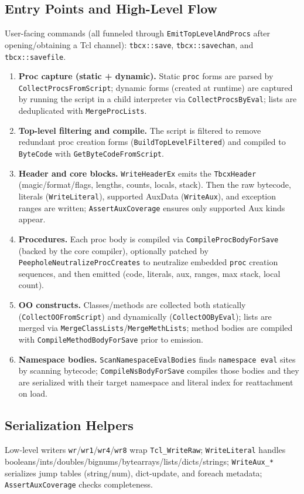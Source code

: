 \documentclass[11pt,a4paper]{article}
\begin{document}
\subsection{Entry Points and High-Level Flow}
User-facing commands (all funneled through \texttt{EmitTopLevelAndProcs} after opening/obtaining a Tcl channel): \texttt{tbcx::save}, \texttt{tbcx::savechan}, and \texttt{tbcx::savefile}.

\begin{enumerate}
  \item \textbf{Proc capture (static + dynamic).} Static \texttt{proc} forms are parsed by \texttt{CollectProcsFromScript}; dynamic forms (created at runtime) are captured by running the script in a child interpreter via \texttt{CollectProcsByEval}; lists are deduplicated with \texttt{MergeProcLists}.
  \item \textbf{Top-level filtering and compile.} The script is filtered to remove redundant proc creation forms (\texttt{BuildTopLevelFiltered}) and compiled to \texttt{ByteCode} with \texttt{GetByteCodeFromScript}.
  \item \textbf{Header and core blocks.} \texttt{WriteHeaderEx} emits the \texttt{TbcxHeader} (magic/format/flags, lengths, counts, locals, stack). Then the raw bytecode, literals (\texttt{WriteLiteral}), supported AuxData (\texttt{WriteAux}), and exception ranges are written; \texttt{AssertAuxCoverage} ensures only supported Aux kinds appear.
  \item \textbf{Procedures.} Each proc body is compiled via \texttt{CompileProcBodyForSave} (backed by the core compiler), optionally patched by \texttt{PeepholeNeutralizeProcCreates} to neutralize embedded \texttt{proc} creation sequences, and then emitted (code, literals, aux, ranges, max stack, local count).
  \item \textbf{OO constructs.} Classes/methods are collected both statically (\texttt{CollectOOFromScript}) and dynamically (\texttt{CollectOOByEval}); lists are merged via \texttt{MergeClassLists}/\texttt{MergeMethLists}; method bodies are compiled with \texttt{CompileMethodBodyForSave} prior to emission.
  \item \textbf{Namespace bodies.} \texttt{ScanNamespaceEvalBodies} finds \texttt{namespace eval} sites by scanning bytecode; \texttt{CompileNsBodyForSave} compiles those bodies and they are serialized with their target namespace and literal index for reattachment on load.
\end{enumerate}

\subsection{Serialization Helpers}
Low-level writers \texttt{wr}/\texttt{wr1}/\texttt{wr4}/\texttt{wr8} wrap \texttt{Tcl\_WriteRaw}; \texttt{WriteLiteral} handles booleans/ints/doubles/bignums/bytearrays/lists/dicts/strings; \texttt{WriteAux\_*} serializes jump tables (string/num), dict-update, and foreach metadata; \texttt{AssertAuxCoverage} checks completeness.
\end{document}
